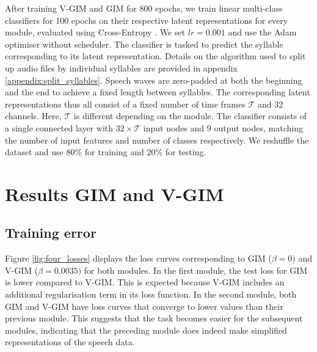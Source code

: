 	
		After training V-GIM and GIM for 800 epochs, we train linear multi-class classifiers for 100 epochs on their respective latent representations for every module, evaluated using Cross-Entropy \citep{hoRealWorldWeightCrossEntropyLoss2020}. We set $lr=0.001$ and use the Adam optimiser without scheduler. The classifier is tasked to predict the syllable corresponding to its latent representation. Details on the algorithm used to split up audio files by individual syllables are provided in appendix \ref{appendix:split_syllables}. Speech waves are zero-padded at both the beginning and the end to achieve a fixed length between syllables. The corresponding latent representations thus all consist of a fixed number of time frames $\mathcal{T}$ and 32 channels. Here, $\mathcal{T}$ is different depending on the module. 
		The classifier consists of a single connected layer with $32 \times \mathcal{T}$ input nodes and 9 output nodes, matching the number of input features and number of classes respectively.  We reshuffle the dataset and use 80\% for training and 20\% for testing.

	

	\section{Results GIM and V-GIM}	
	\subsection{Training error} \label{cha:experiments_vgim_train_err}
		
		
		Figure \ref{fig:four_losses} displays the loss curves corresponding to GIM ($\beta=0$) and V-GIM ($\beta=0.0035)$ for both modules. In the first module, the test loss for GIM is lower compared to V-GIM. This is expected because V-GIM includes an additional regularisation term in its loss function. In the second module, both GIM and V-GIM have loss curves that converge to lower values than their previous module. This suggests that the task becomes easier for the subsequent modules, indicating that the preceding module does indeed make simplified representations of the speech data.
		
